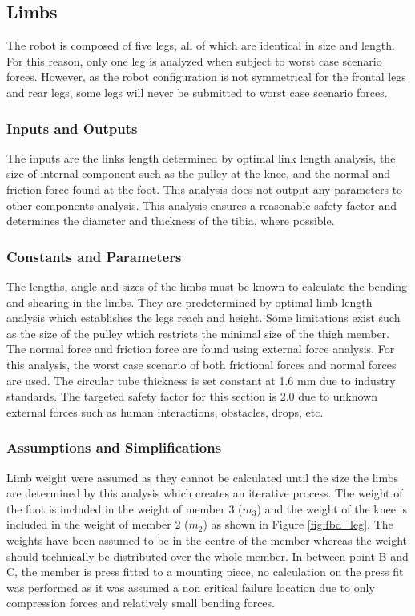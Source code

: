 \subsection{Limbs} \label{subsec:limbs}
The robot is composed of five legs, all of which are identical in size and length. For this reason, only one leg is analyzed when subject to worst case scenario forces. However, as the robot configuration is not symmetrical for the frontal legs and rear legs, some legs will never be submitted to worst case scenario forces.
\subsubsection{Inputs and Outputs}
 The inputs are the links length determined by optimal link length analysis, the size of internal component such as the pulley at the knee, and the normal and friction force found at the foot. 
 This analysis does not output any parameters to other components analysis. This analysis ensures a reasonable safety factor and determines the diameter and thickness of the tibia, where possible.   

\subsubsection{Constants and Parameters}
The lengths, angle and sizes of the limbs must be known to calculate the bending and shearing in the limbs. They are predetermined by optimal limb length analysis which establishes the legs reach and height. Some limitations exist such as the size of the pulley which restricts the minimal size of the thigh member. The normal force and friction force are found using external force analysis. For this analysis, the worst case scenario of both frictional forces and normal forces are used. The circular tube thickness is set constant at 1.6 mm due to industry standards. The targeted safety factor for this section is 2.0 due to unknown external forces such as human interactions, obstacles, drops, etc. 

\subsubsection{Assumptions and Simplifications}
Limb weight were assumed as they cannot be calculated until the size the limbs are determined by this analysis which creates an iterative process. The weight of the foot is included in the weight of member 3 ($m_3$) and the weight of the knee is included in the weight of member 2 ($m_2$) as shown in Figure \ref{fig:fbd_leg}. The weights have been assumed to be in the centre of the member whereas the weight should technically be distributed over the whole member. In between point B and C, the member is press fitted to a mounting piece, no calculation on the press fit was performed as it was assumed a non critical failure location due to only compression forces and relatively small bending forces.

